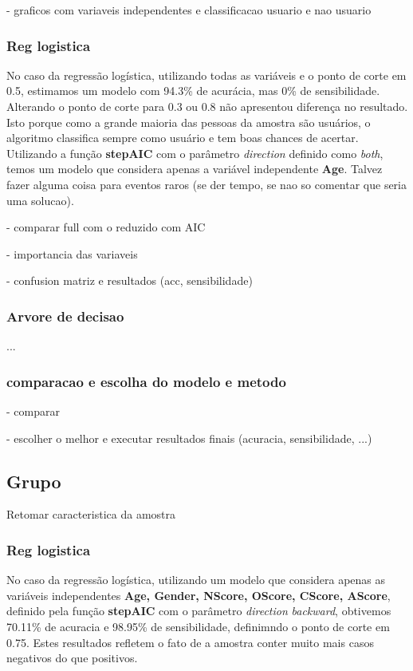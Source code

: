 \documentclass[
	article,			%
	11pt,				%
	oneside,			%
	a4paper,			%
	english,			%
	brazil,				%
	sumario=tradicional
	]{abntex2}
\begin{document}
- graficos com variaveis independentes e classificacao usuario e nao usuario 

\subsubsection{Reg logistica}

No caso da regressão logística, utilizando todas as variáveis e o ponto de corte em 0.5, estimamos um modelo com 94.3\% de acurácia, mas 0\% de sensibilidade. Alterando o ponto de corte para 0.3 ou 0.8 não apresentou diferença no resultado. Isto porque como a grande maioria das pessoas da amostra são usuários, o algoritmo classifica sempre como usuário e tem boas chances de acertar. 
Utilizando a função \textbf{stepAIC} com o parâmetro \emph{direction} definido como \emph{both}, temos um modelo que considera apenas a variável independente \textbf{Age}.
Talvez fazer alguma coisa para eventos raros (se der tempo, se nao so comentar que seria uma solucao).


- comparar full com o reduzido com AIC

- importancia das variaveis

- confusion matriz e resultados (acc, sensibilidade)
\subsubsection{Arvore de decisao}
... 

\subsubsection{comparacao e escolha do modelo e metodo}

- comparar

- escolher o melhor e executar resultados finais (acuracia, sensibilidade, ...)

\subsection{Grupo}

Retomar caracteristica da amostra

\subsubsection{Reg logistica}

No caso da regressão logística, utilizando um modelo que considera apenas as variáveis independentes \textbf{Age, Gender, NScore, OScore, CScore, AScore}, definido pela função \textbf{stepAIC} com o parâmetro \emph{direction} \emph{backward}, obtivemos 70.11\% de acuracia e 98.95\% de sensibilidade, definimndo o ponto de corte em 0.75. Estes resultados refletem o fato de a amostra conter muito mais casos negativos do que positivos. 
\end{document}
